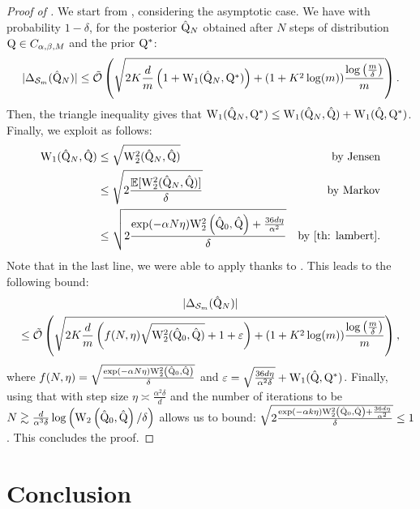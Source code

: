 \begin{proof}[Proof of ]
We start from , considering the asymptotic case. We have with probability $1-\delta$, for the posterior $\hat{\mathrm{Q}}_N$ obtained after $N$ steps of  distribution $\mathrm{Q}\in C_{\alpha,\beta,M}$ and the prior $\mathrm{Q}^*$:
\begin{align*}
|\Delta_{\mathcal{S}_m}(\hat{\mathrm{Q}}_N)|  \leq\Tilde{\mathcal{O}}\left( \sqrt{2K\frac{d}{m}\left(1 + \mathrm{W}_{1}(\hat{\mathrm{Q}}_N,\mathrm{Q}^*)\right)+ (1+K^2\log(m))\frac{\log\left( \frac{m}{\delta} \right)}{m}}   \right).
\end{align*}
Then, the triangle inequality gives that $\mathrm{W}_{1}(\hat{\mathrm{Q}}_N,\mathrm{Q}^*) \leq \mathrm{W}_{1}(\hat{\mathrm{Q}}_N,\hat{\mathrm{Q}}) + \mathrm{W}_{1}(\hat{\mathrm{Q}},\mathrm{Q}^*)$.
Finally, we exploit  as follows:
\begin{align*}
\W_{1}(\hat{\Q}_N,\hat{\Q}) & \leq \sqrt{\W_{2}^2(\hat{\Q}_N,\hat{\Q})} & \text{by Jensen} \\
& \leq \sqrt{2\frac{\mathbb{E}[\W_{2}^2(\hat{\Q}_N,\hat{\Q})]}{\delta}} & \text{by Markov}\\
& \leq \sqrt{2\frac{\exp (-\alpha N \eta) \W_{2}^2\left(\hat{\Q}_0, \hat{\Q}\right)+\frac{36 d \eta}{\alpha^2}}{\delta}} & \text{by \Cref{th: lambert}.}
\end{align*}
Note that in the last line, we were able to apply  thanks to .
This leads to the following bound:
\begin{multline}
\label{eq: complete_bound_sgd}
|\Delta_{\mathcal{S}_m}(\hat{\mathrm{Q}}_N)|  \\
\leq \Tilde{\mathcal{O}}\left( \sqrt{2K\frac{d}{m}\left( f(N,\eta)\sqrt{\mathrm{W}_{2}^2(\hat{\mathrm{Q}}_0,\hat{\mathrm{Q}})} + 1 +
\varepsilon \right)+ (1+K^2\log(m))\frac{\log\left( \frac{m}{\delta} \right)}{m}}   \right),
\end{multline}
where $f(N,\eta)= \sqrt{\frac{\exp (-\alpha N \eta) \mathrm{W}_{2}^2\left(\hat{\mathrm{Q}}_0, \hat{\mathrm{Q}}\right)}{\delta}}$ and $\varepsilon= \sqrt{\frac{36 d \eta}{\alpha^2\delta}} + \mathrm{W}_{1}(\hat{\mathrm{Q}},\mathrm{Q}^*)$.
Finally, using that with step size $\eta \asymp \frac{\alpha^2 \delta}{d}$ and the number of iterations to be $N \gtrsim \frac{d}{\alpha^3 \delta} \log \left(\mathrm{W}_{2}\left(\hat{\mathrm{Q}}_0, \hat{\mathrm{Q}}\right) / \delta\right)$ allows us to bound:
$\sqrt{2\frac{\exp (-\alpha k \eta) \mathrm{W}_{2}^2\left(\hat{\mathrm{Q}}_0, \hat{\mathrm{Q}}\right)+\frac{36 d \eta}{\alpha^2}}{\delta}} \leq 1$.
This concludes the proof.
\end{proof}


\section{Conclusion}


